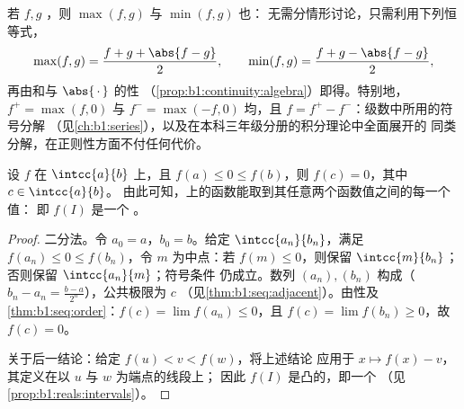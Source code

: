 \begin{example}[连续函数的最大值与最小值]\label{ex:b1:continuity:maxmin}
若 $f, g$ ，则 $\max(f, g)$ 与 $\min(f, g)$ 也：
无需分情形讨论，只需利用下列恒等式，
\[
\max(f, g) = \frac{f + g + \abs{f - g}}{2},
\qquad
\min(f, g) = \frac{f + g - \abs{f - g}}{2},
\]
再由和与 $\abs{\,\cdot\,}$ 的性
（\cref{prop:b1:continuity:algebra}）即得。特别地，$f^+ =
\max(f, 0)$ 与 $f^- = \max(-f, 0)$ 均，且 $f =
f^+ - f^-$：级数中所用的符号分解
（见\cref{ch:b1:series}），以及在本科三年级分册的积分理论中全面展开的
同类分解，在正则性方面不付任何代价。
\end{example}

\begin{theorem}[介值定理]\label{thm:b1:continuity:ivt}
设 $f$ 在 $\intcc{a}{b}$ 上，且 $f(a) \leq 0 \leq
f(b)$，则 $f(c) = 0$，其中 $c \in \intcc{a}{b}$。
由此可知，上的函数能取到其任意两个函数值之间的每一个值：
即 $f(I)$ 是一个
。
\end{theorem}

\begin{proof}
二分法。令 $a_0 = a$，$b_0 = b$。给定 $\intcc{a_n}{b_n}$，满足
$f(a_n) \leq 0 \leq f(b_n)$，令 $m$ 为中点：若 $f(m) \leq
0$，则保留 $\intcc{m}{b_n}$；否则保留 $\intcc{a_n}{m}$；符号条件
仍成立。数列 $(a_n), (b_n)$ 构成（$b_n -
a_n = \frac{b-a}{2^n}$），公共极限为 $c$
（见\cref{thm:b1:seq:adjacent}）。由性及
\cref{thm:b1:seq:order}：$f(c) = \lim f(a_n) \leq 0$，且 $f(c) =
\lim f(b_n) \geq 0$，故 $f(c) = 0$。

关于后一结论：给定 $f(u) < v < f(w)$，将上述结论
应用于 $x \mapsto f(x) - v$，其定义在以 $u$ 与 $w$ 为端点的线段上；
因此 $f(I)$ 是凸的，即一个
（见\cref{prop:b1:reals:intervals}）。
\end{proof}

